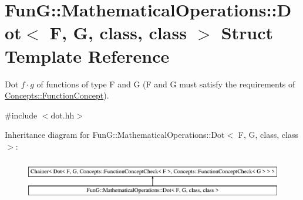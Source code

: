 \hypertarget{structFunG_1_1MathematicalOperations_1_1Dot}{\section{Fun\-G\-:\-:Mathematical\-Operations\-:\-:Dot$<$ F, G, class, class $>$ Struct Template Reference}
\label{structFunG_1_1MathematicalOperations_1_1Dot}
}


Dot $f \cdot g$ of functions of type F and G (F and G must satisfy the requirements of \hyperlink{structFunG_1_1Concepts_1_1FunctionConcept}{Concepts\-::\-Function\-Concept}).  




{\ttfamily \#include $<$dot.\-hh$>$}

Inheritance diagram for Fun\-G\-:\-:Mathematical\-Operations\-:\-:Dot$<$ F, G, class, class $>$\-:\begin{figure}[H]
\begin{center}
\leavevmode
\includegraphics[height=1.797753cm]{structFunG_1_1MathematicalOperations_1_1Dot}
\end{center}
\end{figure}

